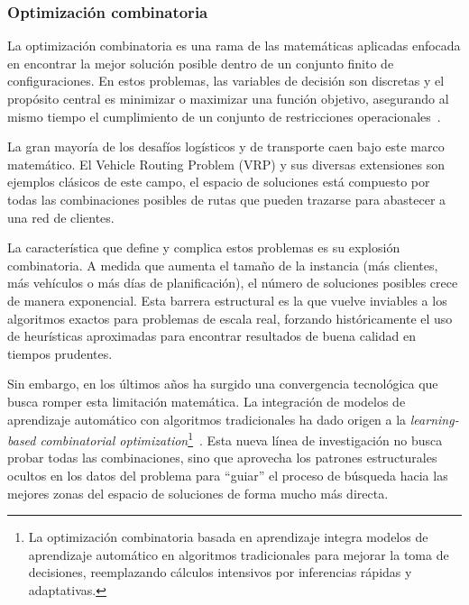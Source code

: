 \subsubsection{Optimización combinatoria} \label{sec:Optimizacioncombinatoria}
La optimización combinatoria es una rama de las matemáticas aplicadas enfocada en encontrar la mejor solución posible dentro de un conjunto finito de configuraciones. En estos problemas, las variables de decisión son discretas y el propósito central es minimizar o maximizar una función objetivo, asegurando al mismo tiempo el cumplimiento de un conjunto de restricciones operacionales~\cite{bengio2020machinelearningcombinatorialoptimization}.

La gran mayoría de los desafíos logísticos y de transporte caen bajo este marco matemático. El Vehicle Routing Problem (VRP) y sus diversas extensiones son ejemplos clásicos de este campo, el espacio de soluciones está compuesto por todas las combinaciones posibles de rutas que pueden trazarse para abastecer a una red de clientes. 

La característica que define y complica estos problemas es su explosión combinatoria. A medida que aumenta el tamaño de la instancia (más clientes, más vehículos o más días de planificación), el número de soluciones posibles crece de manera exponencial. Esta barrera estructural es la que vuelve inviables a los algoritmos exactos para problemas de escala real, forzando históricamente el uso de heurísticas aproximadas para encontrar resultados de buena calidad en tiempos prudentes.

Sin embargo, en los últimos años ha surgido una convergencia tecnológica que busca romper esta limitación matemática. La integración de modelos de aprendizaje automático con algoritmos tradicionales ha dado origen a la \textit{learning-based combinatorial optimization}\footnote{La optimización combinatoria basada en aprendizaje integra modelos de aprendizaje automático en algoritmos tradicionales para mejorar la toma de decisiones, reemplazando cálculos intensivos por inferencias rápidas y adaptativas.}~\cite{bengio2020machinelearningcombinatorialoptimization}. Esta nueva línea de investigación no busca probar todas las combinaciones, sino que aprovecha los patrones estructurales ocultos en los datos del problema para \enquote{guiar} el proceso de búsqueda hacia las mejores zonas del espacio de soluciones de forma mucho más directa.

